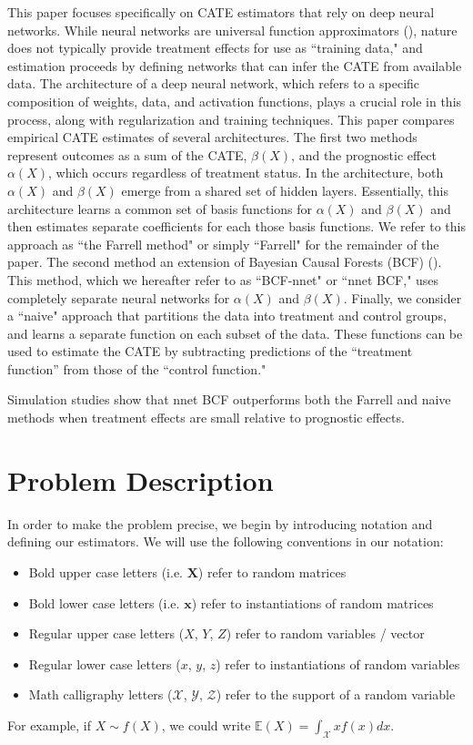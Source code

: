 \documentclass[11pt,  dvipsnames, table, x11name]{article}
\newcommand\E[1]{\mathbb{E}\left(#1\right)}
\begin{document}
	This paper focuses specifically on CATE estimators that rely on deep neural networks. 
	While neural networks are universal function approximators (\cite{cybenko1989approximation}), 
	nature does not typically provide treatment effects for use as ``training data," and estimation 
	proceeds by defining networks that can infer the CATE from available data.
	The architecture of a deep neural network, which refers to a specific composition of weights, data, and 
	activation functions, plays a crucial role in this process, along with regularization and training techniques. 
	This paper compares empirical CATE estimates of several architectures. The first two methods represent 
	outcomes as a sum of the CATE, $\beta(X)$, and the prognostic effect $\alpha(X)$, which occurs regardless 
	of treatment status. In the \cite{farrell2020deep} architecture, both $\alpha(X)$ and $\beta(X)$ emerge from a 
	shared set of hidden layers. Essentially, this architecture learns a common set of basis functions for 
	$\alpha(X)$ and $\beta(X)$ and then estimates separate coefficients for each those basis functions.
	We refer to this approach as ``the Farrell method" or simply ``Farrell" for the remainder of the paper.
	The second method an extension of Bayesian Causal Forests (BCF) (\cite{hahn2020bayesian}). This method, 
	which we hereafter refer to as ``BCF-nnet" or ``nnet BCF," uses completely separate neural networks for 
	$\alpha(X)$ and $\beta(X)$. Finally, we consider a ``naive" approach that partitions the data into 
	treatment and control groups, and learns a separate function on each subset of the data. These functions can be 
	used to estimate the CATE by subtracting predictions of the ``treatment function'' from those of the ``control function."
	
	Simulation studies show that nnet BCF outperforms both the Farrell and naive methods when 
	treatment effects are small relative to prognostic effects.
	\section{Problem Description}
	In order to make the problem precise, we begin by introducing notation and defining our estimators.
	We will use the following conventions in our notation:
	\begin{itemize}
		\item Bold upper case letters (i.e. $\mathbf{X}$) refer to random matrices
		\item Bold lower case letters (i.e. $\mathbf{x}$) refer to instantiations of random matrices
		\item Regular upper case letters ($X$, $Y$, $Z$) refer to random variables / vector
		\item Regular lower case letters ($x$, $y$, $z$) refer to instantiations of random variables
		\item Math calligraphy letters ($\mathcal{X}$, $\mathcal{Y}$, $\mathcal{Z}$) refer to the 
		support of a random variable
	\end{itemize}
	For example, if $X \sim f(X)$, we could write $\E{X} = \int_{\mathcal{X}} x f(x) dx$.
	
\end{document}
